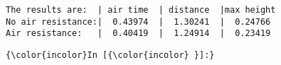 \documentclass[11pt]{article}
\begin{document}
    \begin{Verbatim}[commandchars=\\\{\}]
The results are:  | air time  | distance  |max height
No air resistance:|  0.43974  |  1.30241  |  0.24766  
Air resistance:   |  0.40419  |  1.24914  |  0.23419  

    \end{Verbatim}

    \begin{Verbatim}[commandchars=\\\{\}]
{\color{incolor}In [{\color{incolor} }]:} 
\end{Verbatim}


    
    
    
    
\end{document}
